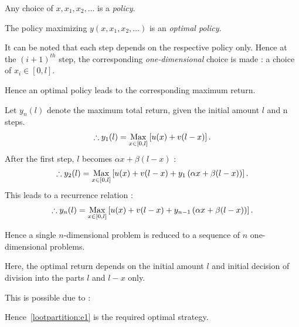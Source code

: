 \begin{s}
\vspace{2mm}

Any choice of $x, x_1, x_2, \ldots$ is a \emph{policy}.

The policy maximizing $y(x, x_1, x_2, \ldots)$ is an \emph{optimal policy}.

\vspace{2mm}

It can be noted that each step depends on the respective policy only. Hence at the $(i + 1)^{th}$ step, the corresponding \emph{one-dimensional} choice is made : a choice of $x_i \in [0, l]$.

\vspace{2 mm}

Hence an optimal policy leads to the corresponding maximum return.

Let $y_n (l)$ denote the maximum total return, given the initial amount $l$ and n steps.
\begin{gather*}
\therefore y_1 (l) =  \operatorname*{Max}\limits_{x \in [0, l]} \left[u(x) + v(l - x)\right].
\end{gather*}
After the first step, $l$ becomes $\alpha x + \beta (l - x)$ :
\begin{gather*}
\therefore y_2 (l) = \operatorname*{Max}\limits_{x \in [0, l]} \left[u(x) + v(l - x) + y_1\left(\alpha x + \beta (l - x)\right) \right].
\end{gather*}
This leads to a recurrence relation :
\begin{gather}
\therefore y_n (l) = \operatorname*{Max}\limits_{x \in [0, l]} \left[u(x) + v(l - x) + y_{n - 1} \left(\alpha x + \beta (l - x)\right) \right] . \label{lootpartition:e1}
\end{gather}

Hence a single $n$-dimensional problem is reduced to a sequence of $n$ one-dimensional problems.

Here, the optimal return depends on the initial amount $l$ and initial decision of division into the parts $l$ and $l - x$ only.

\vspace{2 mm}

This is possible due to  : 
\begin{quote}
\end{quote}
Hence~\cref{lootpartition:e1} is the required optimal strategy.
\end{s}




